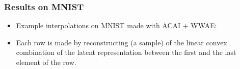 \documentclass{beamer}
\begin{document}
\begin{frame}
\frametitle{Results on MNIST}
\begin{itemize}
  \item Example interpolations on MNIST made with ACAI + WWAE:
  \medskip
  \begin{center}
  \end{center}
  \item Each row is made by reconstructing (a sample) of the linear convex combination of the latent representation between the first and the last element of the row.
\end{itemize}
\end{frame}
\end{document}
